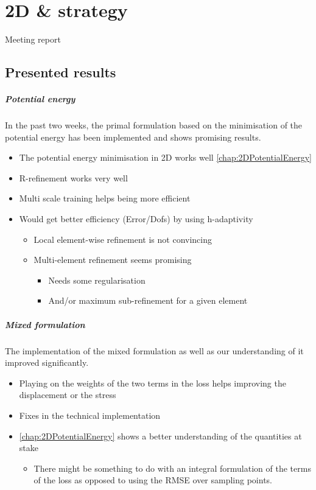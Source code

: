  \chapter[The 26$^{\text{th}}$ of April 2024 -2D]{2D \& strategy}

\begin{chapabstract}
	Meeting report
\end{chapabstract}


\minitoc

\section{Presented results}
\paragraph{Potential energy}
In the past two weeks, the primal formulation based on the minimisation of the potential energy has been implemented and shows promising results.
\begin{itemize}
	\item The potential energy minimisation in 2D works well \cref{chap:2DPotentialEnergy}
	\item R-refinement works very well
	\item Multi scale training helps being more efficient
	\item Would get better efficiency (Error/Dofs) by using h-adaptivity
	\begin{itemize}
		\item Local element-wise refinement is not convincing
		\item Multi-element refinement seems promising
		\begin{itemize}
			\item Needs some regularisation 
			\item And/or maximum sub-refinement for a given element
		\end{itemize}
	\end{itemize}
\end{itemize}

\paragraph{Mixed formulation}
The implementation of the mixed formulation as well as our understanding of it improved significantly.
\begin{itemize}
	\item Playing on the weights of the two terms in the loss helps improving the displacement or the stress
	\item Fixes in the technical implementation
	\item \cref{chap:2DPotentialEnergy} shows a better understanding of the quantities at stake
	\begin{itemize}
		\item There might be something to do with an integral formulation of the terms of the loss as opposed to using the RMSE over sampling points.
	\end{itemize}
\end{itemize}

